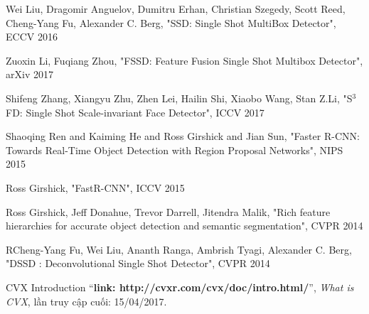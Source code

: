 \documentclass[a4paper]{report}
\begin{document}
\begin{thebibliography}{80}

Wei Liu, Dragomir Anguelov, Dumitru Erhan, Christian Szegedy, Scott Reed, Cheng-Yang Fu, Alexander C. Berg, "SSD: Single Shot MultiBox Detector", ECCV 2016

Zuoxin Li, Fuqiang Zhou, "FSSD: Feature Fusion Single Shot Multibox Detector", arXiv 2017

 Shifeng Zhang, Xiangyu Zhu, Zhen Lei, Hailin Shi, Xiaobo Wang, Stan Z.Li, "S$^ 3$FD: Single Shot Scale-invariant Face Detector", ICCV 2017

 Shaoqing Ren and Kaiming He and Ross Girshick and Jian Sun, "Faster {R-CNN}: Towards Real-Time Object Detection
with Region Proposal Networks", NIPS 2015

 Ross Girshick, "Fast{R-CNN}", ICCV 2015

 Ross Girshick, Jeff Donahue, Trevor Darrell, Jitendra Malik, "Rich feature hierarchies for accurate object detection and semantic segmentation", CVPR 2014 

 RCheng-Yang Fu, Wei Liu, Ananth Ranga, Ambrish Tyagi, Alexander C. Berg, "DSSD : Deconvolutional Single Shot Detector", CVPR 2014 

CVX Introduction
``\textbf{link: http://cvxr.com/cvx/doc/intro.html/}'',
\textit{What is CVX}, lần truy cập cuối: 15/04/2017.

\end{thebibliography}
\end{document}
